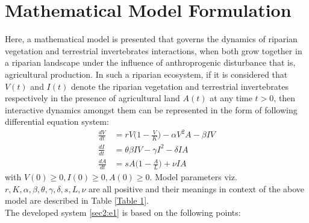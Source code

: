 \documentclass[12pt]{article}
\numberwithin{equation}{section}
\begin{document}
\section{Mathematical Model Formulation}
Here, a mathematical model is presented that governs the dynamics of riparian vegetation and terrestrial invertebrates interactions, when both grow together in a riparian landscape under the influence of anthroprogenic disturbance that is, agricultural production. In such a riparian ecosystem, if it is considered that $V(t)$ and $I(t)$ denote the riparian vegetation and terrestrial invertebrates respectively in the presence of agricultural land $A(t)$ at any time $t>0$, then interactive dynamics amongst them can be represented in the form of following differential equation system:
\begin{subequations}\label{sec2:e1}
	\begin{align}
	\frac{dV}{dt}&=rV\bigg(1-\frac{V}{K}\bigg)-\alpha V^2A -\beta IV\\
	\frac{dI}{dt}&=\theta \beta IV -\gamma I^2 - \delta IA\\
	\frac{dA}{dt}&= sA\bigg(1-\frac{A}{L}\bigg)+\nu IA
	\end{align}
\end{subequations}
with $V(0) \geq 0, I(0)\geq 0, A(0)\geq 0$. Model parameters viz. $r, K, \alpha, \beta, \theta, \gamma, \delta, s, L, \nu$ are all positive and their meanings in context of the above model are described in Table \ref{Table 1}.  \\
The developed system \eqref{sec2:e1} is based on the following points:
\end{document}

